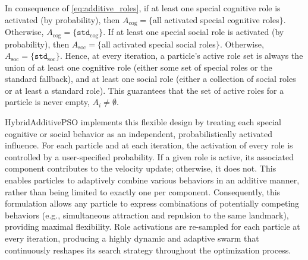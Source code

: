 {In consequence of \eqref{eq:additive_roles}, if at least one special cognitive role is activated (by probability), then
$
A_{\text{cog}} = \{$all activated special cognitive roles$\}$.
Otherwise,
$
A_{\text{cog}} = \{\texttt{std}_{\text{cog}}\}.
$
If at least one special social role is activated (by probability), then
$
A_{\text{soc}} = \{$all activated special social roles$\}$.
Otherwise,
$
A_{\text{soc}} = \{\texttt{std}_{\text{soc}}\}.
$
Hence, at every iteration, a particle’s active role set is always the union of
at least one cognitive role (either some set of special roles or the standard fallback), and
at least one social role (either a collection of social roles or at least a standard role).
This guarantees that the set of active roles for a particle is never empty,
$
A_i \neq \emptyset.
$


HybridAdditivePSO implements this flexible design by treating each special cognitive or social behavior as an independent, probabilistically activated influence. For each particle and at each iteration, the activation of every role is controlled by a user-specified probability. If a given role is active, its associated component contributes to the velocity update; otherwise, it does not. This enables particles to adaptively combine various behaviors in an additive manner, rather than being limited to exactly one per component. Consequently, this formulation allows any particle to express combinations of potentially competing behaviors (e.g., simultaneous attraction and repulsion to the same landmark), providing maximal flexibility.
Role activations are re-sampled for each particle at every iteration, producing a highly dynamic and adaptive swarm that continuously reshapes its search strategy throughout the optimization process.






















}
